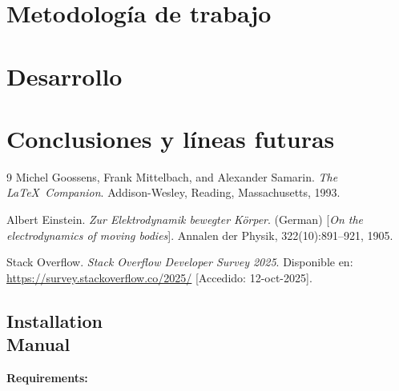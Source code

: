 \documentclass[12pt, a4paper, twoside]{article}
\begin{document}
    \section{Metodología de trabajo}
    \blindmathpaper

\section{Desarrollo}

\section{Conclusiones y líneas futuras}

\begin{thebibliography}{9}
    Michel Goossens, Frank Mittelbach, and Alexander Samarin. 
    \textit{The \LaTeX\ Companion}. 
    Addison-Wesley, Reading, Massachusetts, 1993.
    
    Albert Einstein. 
    \textit{Zur Elektrodynamik bewegter K{\"o}rper}. (German) 
    [\textit{On the electrodynamics of moving bodies}]. 
    Annalen der Physik, 322(10):891–921, 1905.

    Stack Overflow. 
    \textit{Stack Overflow Developer Survey 2025}. 
    Disponible en: \url{https://survey.stackoverflow.co/2025/} [Accedido: 12-oct-2025].
    
\end{thebibliography}

\newpage

\begin{umaappendices}
\section{Installation \\ Manual}
    
    \textbf{\large{Requirements:}}
    
    \blindtext

\end{umaappendices}
\end{document}
